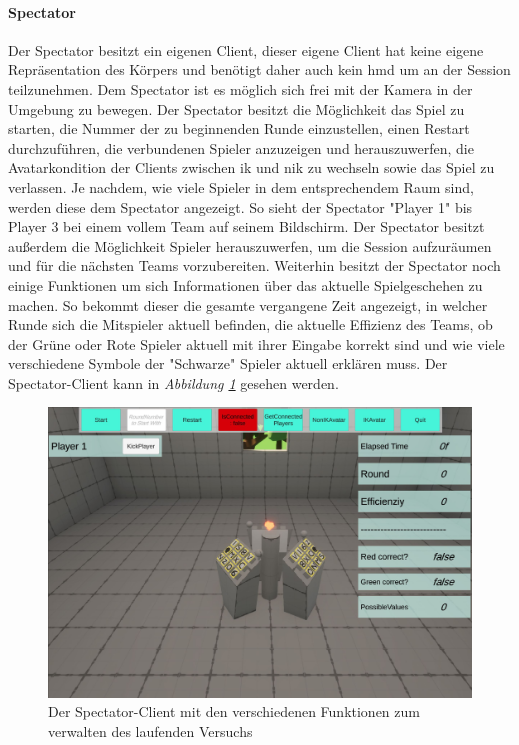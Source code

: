 \documentclass[a4paper,11pt]{article}%
\renewcommand{\\}{\vspace*{0.5\baselineskip} \newline}
\begin{document}
\paragraph{Spectator}
Der Spectator besitzt ein eigenen Client, dieser eigene Client hat keine eigene Repräsentation des Körpers und benötigt daher auch kein \ac{hmd} um an der Session teilzunehmen. Dem Spectator ist es möglich sich frei mit der Kamera in der Umgebung zu bewegen.
Der Spectator besitzt die Möglichkeit das Spiel zu starten, die Nummer der zu beginnenden Runde einzustellen, einen Restart durchzuführen, die verbundenen Spieler anzuzeigen und herauszuwerfen, die Avatarkondition der Clients zwischen \ac{ik} und \ac{nik} zu wechseln sowie das Spiel zu verlassen.
Je nachdem, wie viele Spieler in dem entsprechendem Raum sind, werden diese dem Spectator angezeigt. So sieht der Spectator "Player 1" bis \dq{}Player 3\dq{} bei einem vollem Team auf seinem Bildschirm. Der Spectator besitzt außerdem die Möglichkeit Spieler herauszuwerfen, um die Session aufzuräumen und für die nächsten Teams vorzubereiten.
Weiterhin besitzt der Spectator noch einige Funktionen um sich Informationen über das aktuelle Spielgeschehen zu machen. So bekommt dieser die gesamte vergangene Zeit angezeigt, in welcher Runde sich die Mitspieler aktuell befinden, die aktuelle Effizienz des Teams, ob der \dq{}Grüne\dq{} oder \dq{}Rote\dq{} Spieler aktuell mit ihrer Eingabe korrekt sind und wie viele verschiedene Symbole der "Schwarze" Spieler aktuell erklären muss. Der Spectator-Client kann in \textit{Abbildung \ref{SpectatorView}}  gesehen werden.

\begin{figure}[H]
		\begin{footnotesize}
		\centering
			\includegraphics[scale=0.3]{Abbildungen/Versuchsumgebung/SpectatorView.JPG}\\
			\caption[Abbildung 1]{Der Spectator-Client mit den verschiedenen Funktionen zum verwalten des laufenden Versuchs}
			\label{SpectatorView}
		\end{footnotesize}
	\end{figure}
	
\end{document}
